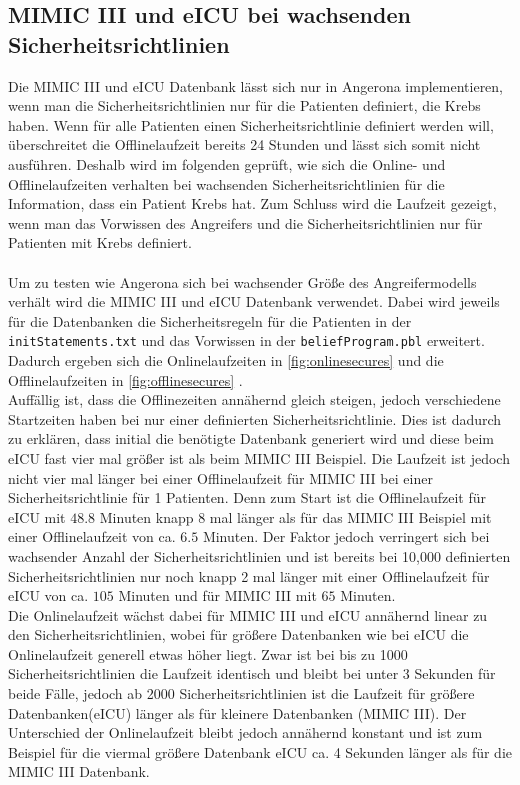 \documentclass[german,version-2020-11]{uzl-thesis}
\begin{document}
\subsection{MIMIC III und eICU bei wachsenden Sicherheitsrichtlinien}
Die MIMIC III und eICU Datenbank lässt sich nur in Angerona implementieren, wenn man die Sicherheitsrichtlinien nur für die Patienten definiert, die Krebs haben. Wenn für alle Patienten einen Sicherheitsrichtlinie definiert werden will, überschreitet die Offlinelaufzeit bereits 24 Stunden und lässt sich somit nicht ausführen. Deshalb wird im folgenden geprüft, wie sich die Online- und Offlinelaufzeiten verhalten bei wachsenden Sicherheitsrichtlinien für die Information, dass ein Patient Krebs hat. Zum Schluss wird die Laufzeit gezeigt, wenn man das Vorwissen des Angreifers und die Sicherheitsrichtlinien nur für Patienten mit Krebs definiert. \\ \\
Um zu testen wie Angerona sich bei wachsender Größe des Angreifermodells verhält wird die MIMIC III und eICU Datenbank verwendet. Dabei wird jeweils für die Datenbanken die Sicherheitsregeln für die Patienten in der \texttt{initStatements.txt} und das Vorwissen in der \texttt{beliefProgram.pbl} erweitert. Dadurch ergeben sich die Onlinelaufzeiten in \autoref{fig:onlinesecures} und die Offlinelaufzeiten in \autoref{fig:offlinesecures} . \\ 
Auffällig ist, dass die Offlinezeiten annähernd gleich steigen, jedoch verschiedene Startzeiten haben bei nur einer definierten  Sicherheitsrichtlinie. Dies ist dadurch zu erklären, dass initial die benötigte Datenbank generiert wird und diese beim eICU fast vier mal größer ist als beim MIMIC III Beispiel. Die Laufzeit ist jedoch nicht vier mal länger bei einer Offlinelaufzeit für MIMIC III bei einer Sicherheitsrichtlinie für 1 Patienten. Denn zum Start ist die Offlinelaufzeit für eICU mit $48.8$ Minuten knapp 8 mal länger als für das MIMIC III Beispiel mit einer Offlinelaufzeit von ca. $6.5$ Minuten. Der Faktor jedoch verringert sich bei wachsender Anzahl der Sicherheitsrichtlinien und ist bereits bei 10,000 definierten Sicherheitsrichtlinien nur noch knapp 2 mal länger mit einer Offlinelaufzeit für eICU von ca. $105$ Minuten und für MIMIC III mit $65$ Minuten. \\ 
Die Onlinelaufzeit wächst dabei für MIMIC III und eICU annähernd linear zu den Sicherheitsrichtlinien, wobei für größere Datenbanken wie bei eICU die Onlinelaufzeit generell etwas höher liegt. Zwar ist bei bis zu 1000 Sicherheitsrichtlinien die Laufzeit identisch und bleibt bei unter 3 Sekunden für beide Fälle, jedoch ab 2000 Sicherheitsrichtlinien ist die Laufzeit für größere Datenbanken(eICU) länger als für kleinere Datenbanken (MIMIC III). Der Unterschied der Onlinelaufzeit bleibt jedoch annähernd konstant und ist zum Beispiel für die viermal größere Datenbank eICU ca. 4 Sekunden länger als für die MIMIC III Datenbank. 
\end{document}
